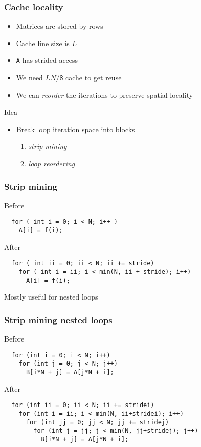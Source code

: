 \documentclass[dvipsnames,presentation,aspectratio=169,14pt]{beamer}
\begin{document}
\begin{frame}
  \frametitle{Cache locality}
  \begin{itemize}
  \item Matrices are stored by rows
  \item Cache line size is $L$
  \item \texttt{A} has strided access
  \item We need $LN/\mathsf{8}$ cache to get reuse
  \item We can \emph{reorder} the iterations to preserve spatial locality
  \end{itemize}
  \begin{answer}{Idea}
    \begin{itemize}
    \item Break loop iteration space into blocks
      \begin{enumerate}[itemsep=6pt]
      \item \emph{strip mining}
      \item \emph{loop reordering}
      \end{enumerate}
    \end{itemize}
  \end{answer}
\end{frame}

\begin{frame}[fragile]
  \frametitle{Strip mining}
  \begin{challenge}{\small Before}
\begin{verbatim}
  for ( int i = 0; i < N; i++ )
    A[i] = f(i);
\end{verbatim}
  \end{challenge}
  \vskip 6pt
  \begin{answer}{\small After}
\begin{verbatim}
  for ( int ii = 0; ii < N; ii += stride)
    for ( int i = ii; i < min(N, ii + stride); i++)
      A[i] = f(i);
\end{verbatim}
  \end{answer}
  \vskip 6pt

  Mostly useful for nested loops
\end{frame}

\begin{frame}[fragile]
  \frametitle{Strip mining nested loops}
    \begin{challenge}{\small Before}
\begin{verbatim}
  for (int i = 0; i < N; i++)
    for (int j = 0; j < N; j++)
      B[i*N + j] = A[j*N + i];
\end{verbatim}
    \end{challenge}

    \begin{answer}{\small After}
\begin{verbatim}
  for (int ii = 0; ii < N; ii += stridei)
    for (int i = ii; i < min(N, ii+stridei); i++)
      for (int jj = 0; jj < N; jj += stridej)
        for (int j = jj; j < min(N, jj+stridej); j++)
          B[i*N + j] = A[j*N + i];
\end{verbatim}
    \end{answer}
\end{frame}
\end{document}
